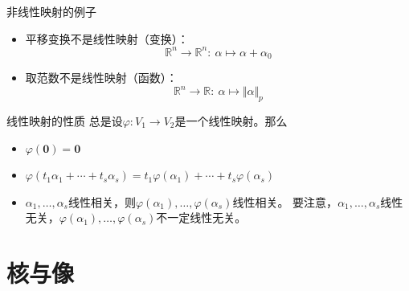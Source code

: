 
\begin{frame}

\begin{block}{非线性映射的例子}
\begin{itemize}
\item 平移变换不是线性映射（变换）：
$$\mathbb{R}^n \to \mathbb{R}^n: \ \alpha \mapsto \alpha + \alpha_0$$
\item 取范数不是线性映射（函数）：
$$\mathbb{R}^n \to \mathbb{R}: \ \alpha \mapsto \Vert\alpha\Vert_p$$
\end{itemize}
\end{block}

\end{frame}


\begin{frame}

\begin{block}{线性映射的性质}
总是设$\varphi: V_1 \to V_2$是一个线性映射。那么
\begin{itemize}
\item $\varphi(\mathbf{0}) = \mathbf{0}$
\item $\varphi(t_1\alpha_1 + \cdots + t_s\alpha_s) = t_1\varphi(\alpha_1) + \cdots + t_s\varphi(\alpha_s)$
\item $\alpha_1, \ldots, \alpha_s$线性相关，则$\varphi(\alpha_1), \ldots, \varphi(\alpha_s)$线性相关。\newline
要注意，$\alpha_1, \ldots, \alpha_s$线性无关，$\varphi(\alpha_1), \ldots, \varphi(\alpha_s)${\color{red}不一定}线性无关。
\end{itemize}
\end{block}

\end{frame}


\section{核与像}


